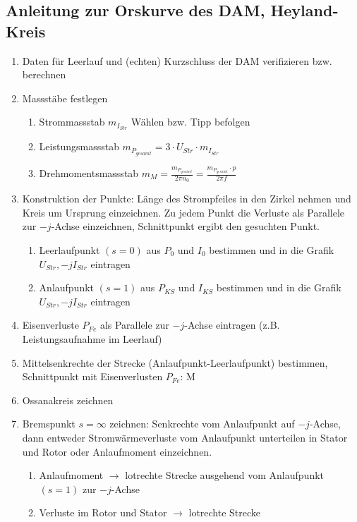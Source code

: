         \newpage
    \subsection{Anleitung zur Orskurve des DAM, Heyland-Kreis}
    \begin{enumerate}
      \item Daten für Leerlauf und (echten) Kurzschluss der DAM verifizieren
      bzw. berechnen
      \item Massstäbe festlegen
      \begin{enumerate}
        \item Strommassstab $m_{I_{Str}}$ Wählen bzw. Tipp befolgen
        \item Leistungsmassstab $m_{P_{gesamt}}=3\cdot U_{Str}\cdot m_{I_{Str}}$
        \item Drehmomentsmassstab $m_M=\frac{m_{P_{gesamt}}}{2\pi n_0} =
        \frac{m_{P_{gesamt}}\cdot p}{2\pi f}$
      \end{enumerate}
      \item Konstruktion der Punkte:
      Länge des Strompfeiles in den Zirkel nehmen und Kreis um Ursprung einzeichnen. Zu jedem Punkt die Verluste als Parallele zur $-j$-Achse einzeichnen, Schnittpunkt ergibt den gesuchten Punkt.
      \begin{enumerate}
      	\item Leerlaufpunkt $(s=0)$ aus $P_0$ und $I_0$ bestimmen und in die Grafik $U_{Str},-jI_{Str}$ eintragen
        \item Anlaufpunkt $(s=1)$ aus $P_{KS}$ und $I_{KS}$ bestimmen und in die Grafik $U_{Str},-jI_{Str}$ eintragen
      \end{enumerate}
      \item Eisenverluste $P_{Fe}$ als Parallele zur $-j$-Achse eintragen (z.B. Leistungsaufnahme im Leerlauf)
      \item Mittelsenkrechte der Strecke (Anlaufpunkt-Leerlaufpunkt) bestimmen, Schnittpunkt mit Eisenverlusten $P_{Fe}$: M
      \item Ossanakreis zeichnen
      \item Bremspunkt $s=\infty$ zeichnen: Senkrechte vom Anlaufpunkt auf $-j$-Achse, dann entweder Stromwärmeverluste vom Anlaufpunkt unterteilen in Stator und Rotor oder Anlaufmoment einzeichnen.
      \begin{enumerate}
        \item Anlaufmoment $\rightarrow$ lotrechte Strecke ausgehend vom Anlaufpunkt $(s=1)$ zur $-j$-Achse
        \item Verluste im Rotor und Stator $\rightarrow$ lotrechte Strecke

\end{enumerate}
\end{enumerate}
